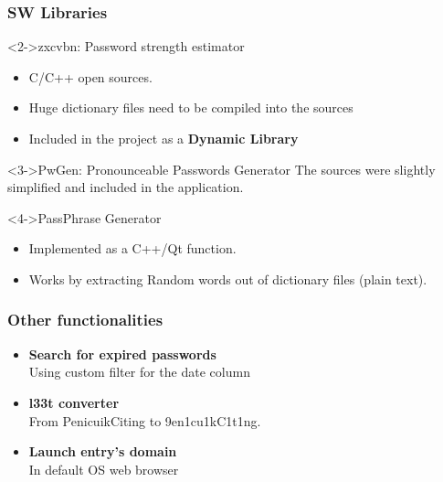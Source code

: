 \documentclass[14pt,usenames,dvipsnames]{beamer}
\begin{document}
\begin{frame}
  \frametitle{SW Libraries}

	  \begin{block}<2->{zxcvbn: Password strength estimator}
		\begin{itemize}
		\setlength\itemsep{0pt}
			\item C/C++ open sources.
			\item Huge dictionary files need to be compiled into the sources
			\item Included in the project as a \textbf{\color{NavyBlue} Dynamic Library}
		\end{itemize}
	\end{block}


	\begin{block}<3->{PwGen: Pronounceable Passwords Generator}
    The sources were slightly simplified and included in the application.
  \end{block}


	\begin{block}<4->{PassPhrase Generator}
		\begin{itemize}
				\setlength\itemsep{0pt}
		  \item Implemented as a C++/Qt function.
		  \item Works by extracting Random words out of dictionary files (plain text).
		\end{itemize}
  \end{block}
\end{frame}

\begin{frame}
	\frametitle{Other functionalities}
  \begin{itemize}
  	\setlength\itemsep{25pt}
    \item<2-> \textbf{Search for expired passwords} \\
    Using custom filter for the date column 

    \item<3-> \textbf{l33t converter} \\
    From {\color{NavyBlue} PenicuikCiting} to {\color{NavyBlue} 9en1cu1kC1t1ng}.

    \item<4-> \textbf{Launch entry's domain} \\
    In default OS web browser

  \end{itemize}  	
	
\end{frame}
\end{document}

